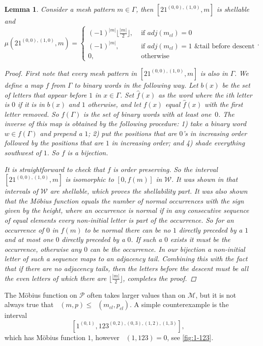 \documentclass[preprint,11pt]{elsarticle}
\newtheorem{lem}[thm]{Lemma}\crefname{lem}{Lemma}{Lemmas}
\newcommand\cl[1]{#1_{cl}}
\DeclareMathOperator{\muP}{\mu_\mathcal{P}}
\DeclareMathOperator{\muM}{\mu_\mathcal{M}}
\numberwithin{equation}{section}
\numberwithin{figure}{section}
\numberwithin{thm}{section}
\begin{document}
\begin{lem}\label{lem:mobUn}
Consider a mesh pattern $m\in \Gamma$, then $[21^{(0,0),(1,0)},m]$ is shellable and
\[
\mu(21^{(0,0),(1,0)},m)=\begin{cases}
(-1)^{|m|}\lfloor\frac{|m|}{2}\rfloor,&\text{ if } adj(\cl{m})=0\\
(-1)^{|m|},& \text{ if } adj(\cl{m})=1 \text{ \& tail before descent}\\
0, &\text{ otherwise}
\end{cases}.
\]
\begin{proof}
First note that every mesh pattern in $[21^{(0,0),(1,0)},m]$ is also in $\Gamma$.
We define a map $f$ from $\Gamma$ to binary words in the following way. Let $b(x)$ be the
set of letters that appear before $1$ in $x\in \Gamma$. Set $\hat{f}(x)$ as the word where
the $i$th letter is $0$ if it is in $b(x)$ and $1$ otherwise, and let $f(x)$
equal $\hat{f}(x)$ with the first letter removed.
So $f(\Gamma)$ is the set of binary words with at least one~$0$. The inverse of this map
is obtained by the following procedure: 1) take a binary word $w\in f(\Gamma)$ and prepend a $1$;
2) put the positions that are $0$'s in increasing order followed by 
the positions that are $1$ in increasing order; and 4) shade everything southwest of $1$. 
So $f$ is a bijection.

It is straightforward
to check that $f$ is order preserving. So
the interval~$[21^{(0,0),(1,0)},m]$ is isomorphic to $[0,f(m)]$ in $\mathcal{W}$.
It was shown in
\cite{Bjo90} that intervals of $\mathcal{W}$
are shellable, which proves the shellability part. It was also shown that the M\"obius
function equals the number of normal
occurrences with the sign given by the height,
where an occurrence is \emph{normal} if in any consecutive sequence
of equal elements every
non-initial letter is part of the occurrence.
So for an occurrence of $0$ in $f(m)$ to be normal there can be no $1$ directly preceded by a $1$ and at most one
$0$ directly preceded by a $0$. If such a $0$ exists it must be the occurrence,
otherwise any $0$ can be the occurrence. In our bijection a non-initial letter 
of such a sequence maps to an adjacency tail.  Combining this with the fact that if there are no adjacency tails, then the letters before the descent must be all the even letters of which there are $\lfloor\frac{|m|}{2}\rfloor$, completes the proof.
\end{proof}
\end{lem}

The M\"obius function on $\mathcal{P}$ often takes larger values than on $\mathcal{M}$,
but it is not always true that $\muM(m,p)\le
\muP(\cl{m},\cl{p})$. A simple counterexample is the interval
$$[1^{(0,1)},123^{(0,2),(0,3),(1,2),(1,3)}],$$ which has M\"obius function $1$,
however $\muP(1,123)=0$, see \cref{fig:1-123}.
\end{document}
